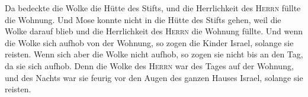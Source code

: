  Da bedeckte die Wolke die Hütte des Stifts, und die
Herrlichkeit des \textsc{Herrn} füllte die Wohnung.  Und
Mose konnte nicht in die Hütte des Stifts gehen, weil die Wolke darauf
blieb und die Herrlichkeit des \textsc{Herrn} die Wohnung füllte.
 Und wenn die Wolke sich aufhob von der Wohnung, so zogen
die Kinder Israel, solange sie reisten.  Wenn sich aber
die Wolke nicht aufhob, so zogen sie nicht bis an den Tag, da sie sich
aufhob.  Denn die Wolke des \textsc{Herrn} war des Tages
auf der Wohnung, und des Nachts war sie feurig vor den Augen des ganzen
Hauses Israel, solange sie reisten.
